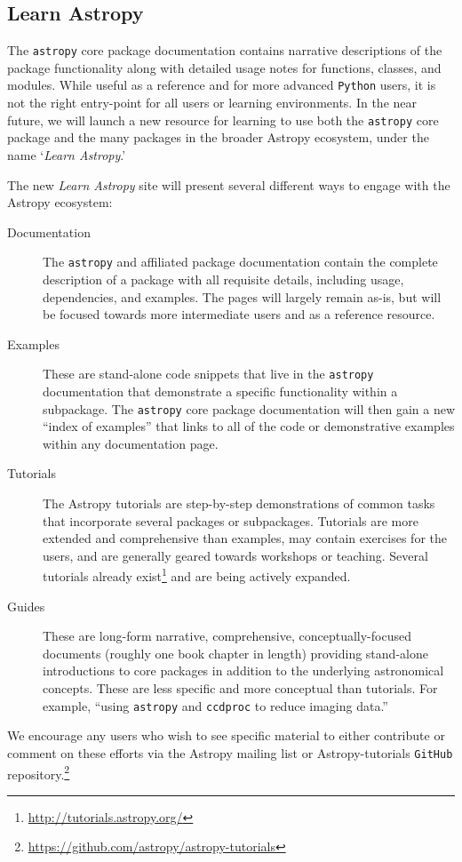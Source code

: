 \documentclass[modern]{aastex61}
\newcommand{\package}[1]{\texttt{#1}\xspace}
\newcommand{\github}{\package{GitHub}}
\newcommand{\python}{\package{Python}}
\newcommand{\astropy}{Astropy\xspace}
\newcommand{\astropypkg}{\package{astropy}}
\begin{document}
\subsection{Learn Astropy}

The \astropypkg core package documentation contains narrative descriptions of
the package functionality along with detailed usage notes for functions,
classes, and modules.
While useful as a reference and for more advanced \python users, it is not the
right entry-point for all users or learning environments.
In the near future, we will launch a new resource for learning to use both the
\astropypkg core package and the many packages in the broader \astropy
ecosystem, under the name `\emph{Learn Astropy}.'

The new \emph{Learn Astropy} site will present several different ways to engage
with the \astropy ecosystem:
\begin{description}
    \item[Documentation] The \astropypkg and affiliated package documentation
        contain the complete description of a package with all requisite
        details, including usage, dependencies, and examples.
        The pages will largely remain as-is, but will be focused towards more
        intermediate users and as a reference resource.
    \item[Examples] These are stand-alone code snippets that live in the
        \astropypkg documentation that demonstrate a specific functionality
        within a subpackage.
        The \astropypkg core package documentation will then gain a new ``index
        of examples'' that links to all of the code or demonstrative examples
        within any documentation page.
    \item[Tutorials] The \astropy tutorials are step-by-step demonstrations of
        common tasks that incorporate several packages or subpackages.
        Tutorials are more extended and comprehensive than examples, may contain
        exercises for the users, and are generally geared towards workshops or
        teaching.
        Several tutorials already
        exist\footnote{\url{http://tutorials.astropy.org/}} and are being
        actively expanded.
    \item[Guides] These are long-form narrative, comprehensive,
        conceptually-focused documents (roughly one book chapter in length)
        providing stand-alone introductions to core packages in addition to the
        underlying astronomical concepts.
        These are less specific and more conceptual than tutorials.
        For example, ``using \astropypkg and \package{ccdproc} to reduce imaging
        data.''
\end{description}
We encourage any users who wish to see specific material to either contribute or
comment on these efforts via the \astropy mailing list or \astropy-tutorials
\github repository.\footnote{\url{https://github.com/astropy/astropy-tutorials}}
\end{document}
